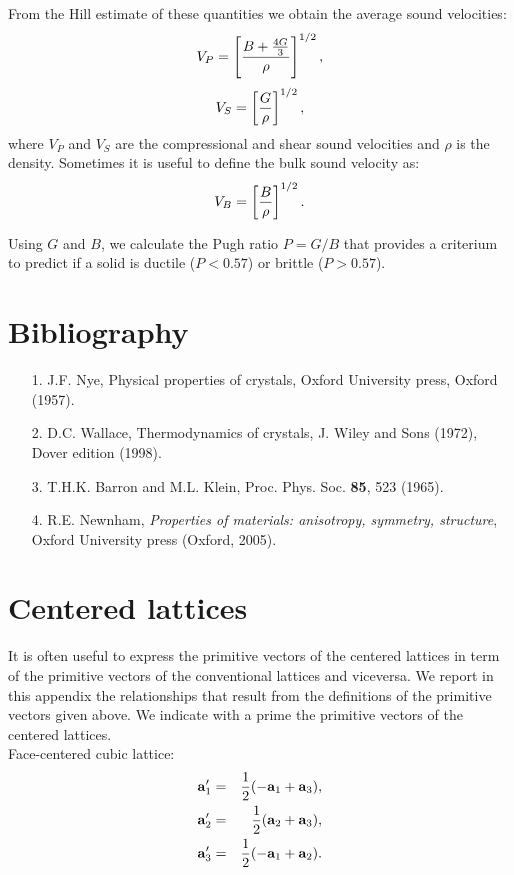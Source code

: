 \documentclass[12pt,a4paper,twoside]{report}
\begin{document}
From the Hill estimate of these quantities we obtain the average sound
velocities:
\begin{equation}
V_P = \left[{B + {4 G \over 3} \over \rho}\right]^{1/2},
\end{equation}
\begin{equation}
V_S = \left[{G \over \rho}\right]^{1/2},
\end{equation}
where $V_P$ and $V_S$ are the compressional and shear sound velocities 
and $\rho$ is the density.
Sometimes it is useful to define the bulk sound velocity as:
\begin{equation}
V_B = \left[{B \over \rho}\right]^{1/2}.
\end{equation}

Using $G$ and $B$, we calculate the Pugh ratio $P=G/B$ that provides
a criterium to predict if a solid is ductile ($P<0.57$) or brittle ($P>0.57$).

{\color{dark-blue}\chapter{Bibliography}}
\color{black}

\begin{enumerate}


\item
[1.] J.F. Nye, Physical properties of crystals, Oxford University press, 
Oxford (1957).

\item
[2.] D.C. Wallace, Thermodynamics of crystals, J. Wiley and Sons (1972),
Dover edition (1998).

\item
[3.] T.H.K. Barron and M.L. Klein, Proc. Phys. Soc. {\bf 85}, 523 (1965).

\item
[4.] R.E. Newnham, {\it Properties of materials: anisotropy, symmetry,
structure}, Oxford University press (Oxford, 2005).

\end{enumerate}

\newpage

\appendix
{\color{dark-blue}\chapter{Centered lattices}}
\color{black}

It is often useful to express the primitive vectors of the centered
lattices in term of the primitive vectors of the conventional lattices
and viceversa. We report in this appendix the relationships that result
from the definitions of the primitive vectors given above.
We indicate with a prime the primitive vectors of the centered lattices. \\
Face-centered cubic lattice:
\begin{eqnarray}
{\bf a}_1'&=&{1\over 2} (-{\bf a}_1 + {\bf a}_3), \\
{\bf a}_2'&=&{1\over 2} ({\bf a}_2 + {\bf a}_3), \\
{\bf a}_3'&=&{1\over 2} (-{\bf a}_1 + {\bf a}_2). 
\end{eqnarray}
\end{document}
